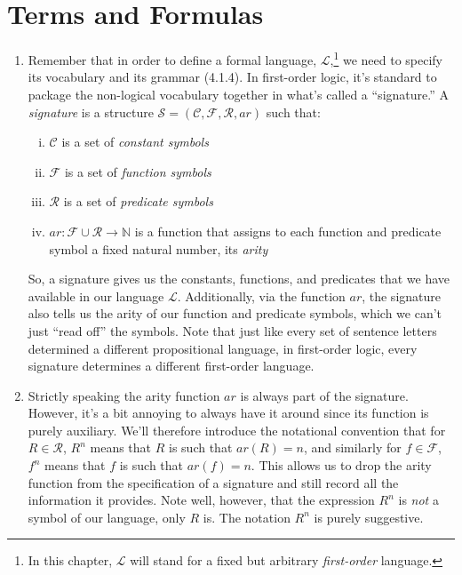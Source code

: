 \section{Terms and Formulas}

	\begin{enumerate}[\thesection.1]

		\item Remember that in order to define a formal language, $\mathcal{L}$,\footnote{In this chapter, $\mathcal{L}$ will stand for a fixed but arbitrary \emph{first-order} language.} we need to specify its vocabulary and its grammar (4.1.4). In first-order logic, it's standard to package the non-logical vocabulary together in what's called a ``signature.'' A \emph{signature} is a structure $\mathcal{S}=(\mathcal{C}, \mathcal{F}, \mathcal{R}, ar)$ such that:
		\begin{enumerate}[(i)]
		
			\item $\mathcal{C}$ is a set of \emph{constant symbols}
			
			\item $\mathcal{F}$ is a set of \emph{function symbols}
			
			\item $\mathcal{R}$ is a set of \emph{predicate symbols}
			
			\item $ar:\mathcal{F}\cup\mathcal{R}\to\mathbb{N}$ is a function that assigns to each function and predicate symbol a fixed natural number, its \emph{arity}
		\end{enumerate}
	So, a signature gives us the constants, functions, and predicates that we have available in our language $\mathcal{L}$. Additionally, via the function $ar$, the signature also tells us the arity of our function and predicate symbols, which we can't just ``read off'' the symbols. Note that just like every set of sentence letters determined a different propositional language, in first-order logic, every signature determines a different first-order language.
	
		\item Strictly speaking the arity function $ar$ is always part of the signature. However, it's a bit annoying to always have it around since its function is purely auxiliary. We'll therefore introduce the notational convention that for $R\in\mathcal{R}$, $R^n$ means that $R$ is such that $ar(R)=n$, and similarly for $f\in\mathcal{F}$, $f^n$ means that $f$ is such that $ar(f)=n$. This allows us to drop the arity function from the specification of a signature and still record all the information it provides. Note well, however, that the expression $R^n$ is \emph{not} a symbol of our language, only $R$ is. The notation $R^n$ is purely suggestive.  
	

\end{enumerate}
